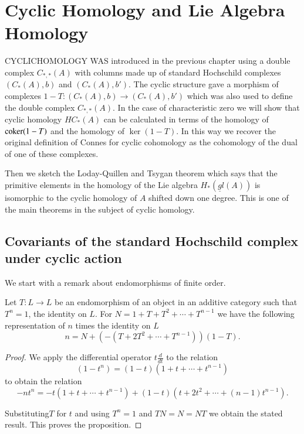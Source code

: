 \chapter{Cyclic Homology and Lie Algebra Homology}\label{chap4}

CYCLIC\pageoriginale HOMOLOGY WAS introduced in the previous chapter
using a double complex $C_{\ast,\ast}(A)$ with columns made up of
standard Hochschild complexes $(C_{\ast}(A),b)$ and
$(C_{\ast}(A),b')$. The cyclic structure gave a morphism of complexes
$1-T:(C_{\ast}(A),b)\to (C_{\ast}(A),b')$ which was also used to
define the double complex $C_{\ast,\ast}(A)$. In the case of
characteristic zero we will show that cyclic homology $HC_{\ast}(A)$
can be calculated in terms of the homology of $\operatorname{coker}(1-T)$ and the
homology of $\ker(1-T)$. In this way we recover the original
definition of Connes for cyclic cohomology as the cohomology of the
dual of one of these complexes.

Then we sketch the Loday-Quillen and Tsygan theorem which says that
the primitive elements in the homology of the Lie algebra
$H_{\ast}(\underline{g}l(A))$ is isomorphic to the cyclic homology of
$A$ shifted down one degree. This is one of the main theorems in the
subject of cyclic homology.

\section[Covariants of the standard Hochschild complex...]{Covariants
  of the standard Hochschild complex under cyclic 
  action}\label{chap4-sec1} 

We start with a remark about endomorphisms of finite order.

\begin{proposition}\label{chap4-prop1.1}
Let $T:L\to L$ be an endomorphism of an object in an additive category
such that $T^{n}=1$, the identity on $L$. For
$N=1+T+T^{2}+\cdots+T^{n-1}$ we have the following representation of
$n$ times the identity on $L$
$$
n=N+(-(T+2T^{2}+\cdots+T^{n-1}))(1-T).
$$
\end{proposition}

\begin{proof}
We apply the differential operator $t\frac{d}{dt}$ to the relation
$$
(1-t^{n})=(1-t)(1+t+\cdots+t^{n-1})
$$
to obtain the relation
$$
-nt^{n}=-t(1+t+\cdots+t^{n-1})+(1-t)(t+2t^{2}+\cdots+(n-1)t^{n-1}).
$$

Substituting\pageoriginale $T$ for $t$ and using $T^{n}=1$ and
$TN=N=NT$ we obtain the stated result. This proves the proposition.
\end{proof}

